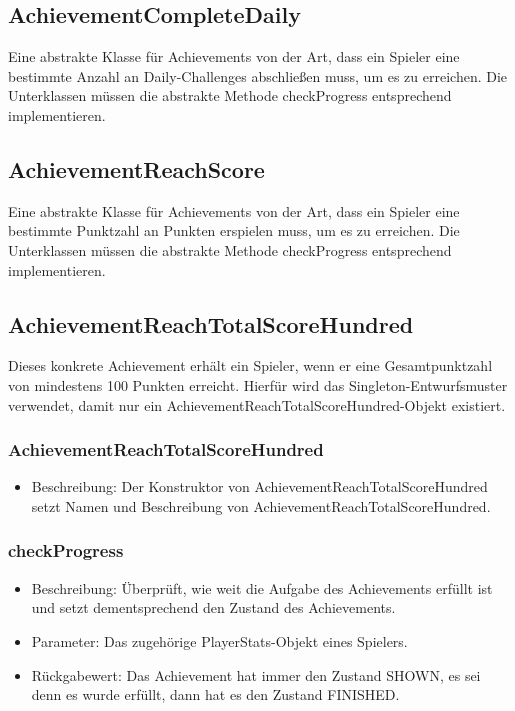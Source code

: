 \documentclass[a4paper]{scrreprt}
\begin{document}
	\subsection{AchievementCompleteDaily}
	Eine abstrakte Klasse für Achievements von der Art, dass ein Spieler eine bestimmte Anzahl an Daily-Challenges abschließen muss, um es zu erreichen. Die Unterklassen müssen die abstrakte Methode checkProgress entsprechend implementieren.

	\subsection{AchievementReachScore}
	Eine abstrakte Klasse für Achievements von der Art, dass ein Spieler eine bestimmte Punktzahl an Punkten erspielen muss, um es zu erreichen. Die Unterklassen müssen die abstrakte Methode checkProgress entsprechend implementieren.

	\subsection{AchievementReachTotalScoreHundred}
	Dieses konkrete Achievement erhält ein Spieler, wenn er eine Gesamtpunktzahl von mindestens 100 Punkten erreicht. Hierfür wird das Singleton-Entwurfsmuster verwendet, damit nur ein AchievementReachTotalScoreHundred-Objekt existiert.

	\subsubsection{AchievementReachTotalScoreHundred}
	\begin{itemize}
		\item Beschreibung: Der Konstruktor von AchievementReachTotalScoreHundred setzt Namen und Beschreibung von AchievementReachTotalScoreHundred.
	\end{itemize}
	\subsubsection{checkProgress}
	\begin{itemize}
		\item Beschreibung: Überprüft, wie weit die Aufgabe des Achievements erfüllt ist und setzt dementsprechend den Zustand des Achievements.
		\item Parameter: Das zugehörige PlayerStats-Objekt eines Spielers.
		\item Rückgabewert: Das Achievement hat immer den Zustand SHOWN, es sei denn es wurde erfüllt, dann hat es den Zustand FINISHED.
	\end{itemize}
\end{document}

